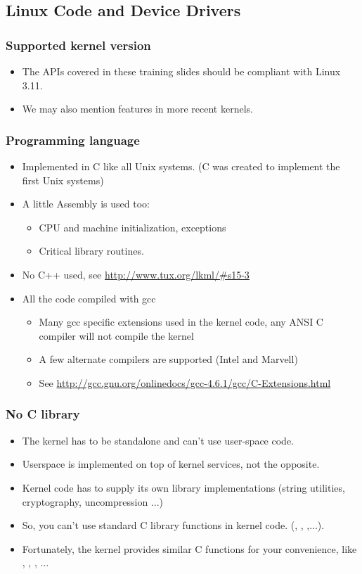 \subsection{Linux Code and Device Drivers}

\begin{frame}
  \frametitle{Supported kernel version}
  \begin{itemize}
  \item The APIs covered in these training slides should be compliant
    with Linux 3.11.
  \item We may also mention features in more recent kernels.
  \end{itemize}
\end{frame}


\begin{frame}
  \frametitle{Programming language}
  \begin{itemize}
  \item Implemented in C like all Unix systems. (C was created to
    implement the first Unix systems)
  \item A little Assembly is used too:
    \begin{itemize}
    \item CPU and machine initialization, exceptions
    \item Critical library routines.
    \end{itemize}
  \item No C++ used, see \url{http://www.tux.org/lkml/\#s15-3}
  \item All the code compiled with gcc
    \begin{itemize}
    \item Many gcc specific extensions used in the kernel code, any
      ANSI C compiler will not compile the kernel
    \item A few alternate compilers are supported (Intel and Marvell)
    \item See
      \url{http://gcc.gnu.org/onlinedocs/gcc-4.6.1/gcc/C-Extensions.html}
    \end{itemize}
  \end{itemize}
\end{frame}

\begin{frame}
  \frametitle{No C library}
  \begin{itemize}
  \item The kernel has to be standalone and can't use user-space code.
  \item Userspace is implemented on top of kernel services, not the
    opposite.
  \item Kernel code has to supply its own library implementations
    (string utilities, cryptography, uncompression ...)
  \item So, you can't use standard C library functions in kernel code.
    (, , ,...).
  \item Fortunately, the kernel provides similar C functions for your
    convenience, like , ,
    , ...
  \end{itemize}
\end{frame}

